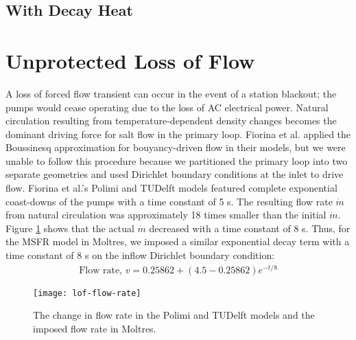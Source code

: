 \clearpage

\subsection{With Decay Heat}

\clearpage

\section{Unprotected Loss of Flow}

A loss of forced flow transient can occur in the event of a station
blackout; the pumps would cease operating due to the loss of AC electrical
power. Natural circulation resulting from temperature-dependent density
changes becomes the dominant driving force for salt flow in the primary loop.
Fiorina et al. \cite{fiorina_modelling_2014} applied the Boussinesq
approximation for bouyancy-driven flow in their models, but we were unable to
follow this procedure because we partitioned the
primary loop into two separate geometries and used Dirichlet boundary
conditions at the inlet to drive flow. Fiorina et al.'s Polimi and TUDelft
models featured complete exponential coast-downs of the pumps with a time
constant of 5 s. The resulting flow rate $\dot{m}$ from natural circulation was
approximately 18 times smaller than the initial $\dot{m}$. Figure
\ref{fig:flowrate} shows that the actual $\dot{m}$ decreased with a time
constant of 8 s. Thus, for the \gls{MSFR} model in Moltres, we imposed a
similar exponential decay term with a time constant of 8 s on the inflow
Dirichlet boundary condition:
%
\begin{align}
    \text{Flow rate, } v = 0.25862 + (4.5-0.25862) e^{-t/8} 
    \label{eq:flowrate}
\end{align}

\begin{figure}[htbp!]
    \centering
    \texttt{[image: lof-flow-rate]}
    \caption{The change in flow rate in the Polimi and TUDelft models and the
    imposed flow rate in Moltres.}
    \label{fig:flowrate}
\end{figure}

